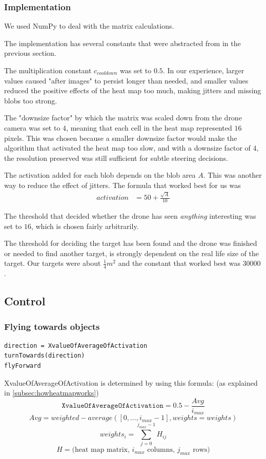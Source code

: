 \documentclass[a4paper,10pt]{article}
\begin{document}
\subsubsection{Implementation}
We used NumPy to deal with the matrix calculations.

The implementation has several constants that were abstracted from in the
previous section.

The multiplication constant $c_{{cooldown}}$ was set to
$0.5$. In our experience, larger values caused "after images" to persist
longer than needed, and smaller values reduced the positive effects of
the heat map too much, making jitters and missing blobs too strong.

The "downsize factor" by which the matrix was scaled down from the
drone camera was set to $4$, meaning that each cell in the heat map represented $16$
pixels. This was chosen because a smaller downsize factor would make the
algorithm that activated the heat map too slow, and with a downsize factor of
$4$, the resolution preserved was still sufficient for subtle steering
decisions.

The activation added for each blob depends on the blob area $A$. This was
another way to reduce the effect of jitters. The formula
that worked best for us was
\begin{align*}
 activation &=50 + \frac{\sqrt{A}}{10}
\end{align*}


The threshold that decided whether the drone has seen \emph{anything}
interesting was set to $16$, which is chosen fairly arbitrarily.

The threshold for deciding the target has been found and the drone was
finished or needed to find another target, is strongly dependent on the
real life size of the target. Our targets were about $\frac{1}{4} m^2$
and the constant that worked best was $30 000$.


\subsection{Control}

\subsubsection{Flying towards objects\label{flytowards}}
\begin{verbatim}
direction = XvalueOfAverageOfActivation
turnTowards(direction)
flyForward
\end{verbatim}
XvalueOfAverageOfActivation is determined by using this formula: (as explained in \ref{subsec:howheatmapworks})
\[\texttt{XvalueOfAverageOfActivation} = 0.5 - \frac{Avg}{i_{max}}\]
\[Avg = weighted-average([0, ..., i_{max} - 1], weights=weights)\]
\[weights_i = \sum_{j=0}^{j_{max}-1} H_{ij} \]
\[H = \textrm{(heat map matrix, $i_{max}$ columns, $j_{max}$ rows)}\]
\end{document}
